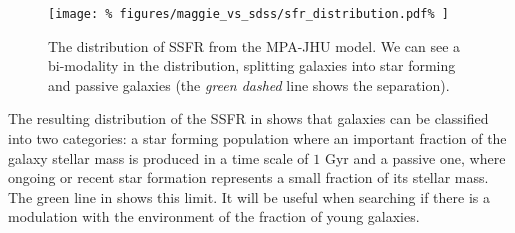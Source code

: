 \begin{figure}[htb]
    \centering
    \texttt{[image: \%
        figures/maggie\_vs\_sdss/sfr\_distribution.pdf\%
    ]}
    \caption{The distribution of SSFR from the MPA-JHU model. We can see a
    bi-modality in the distribution, splitting galaxies into star forming
and passive galaxies (the \emph{green dashed} line shows the
separation).\label{fig:ssfr_distribution}}
\end{figure}

The resulting distribution of the SSFR in 
shows that galaxies can be classified into two categories: a star forming
population where an important fraction of the galaxy stellar mass is produced
in a time scale of $1$ Gyr and a passive one, where ongoing or recent star
formation represents a small fraction of its stellar mass. The green line in
 shows this limit. It will be useful when
searching if there is a modulation with the environment of the fraction of
young galaxies.

